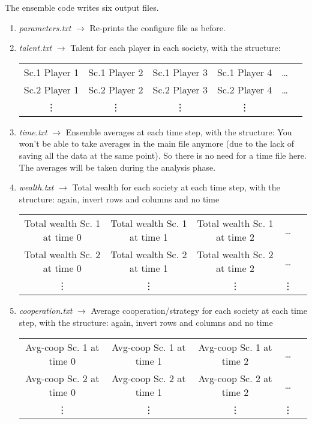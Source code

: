 \documentclass{article}
\begin{document}
The ensemble code writes six output files. 
\begin{enumerate}
\item \emph{parameters.txt} $\rightarrow$ Re-prints the configure file as before. 

\item \emph{talent.txt} $\rightarrow$ Talent for each player in each society, with the structure:

\begin{center}
\begin{tabular}{c c c c c c}
Sc.1 Player 1 & Sc.1 Player 2 & Sc.1 Player 3 & Sc.1 Player 4 & \dots \\ 
Sc.2 Player 1 & Sc.2 Player 2 & Sc.2 Player 3 & Sc.2 Player 4 & \dots \\
\vdots & \vdots &  \vdots &  \vdots &   
\end{tabular} 
\end{center}


\item \emph{time.txt} $\rightarrow$ Ensemble averages at each time step, with the structure:
{\color{red}You won't be able to take averages in the main file anymore (due to the lack of saving all the data at the same point). So there is no need for a time file here. The averages will be taken during the analysis phase.}

\item \emph{wealth.txt} $\rightarrow$ Total wealth for each society at each time step, with the structure:
{\color{red}again, invert rows and columns and no time}

\begin{center}
\begin{tabular}{c c c c c}
Total wealth Sc. 1 at time 0 & Total wealth Sc. 1 at time 1  & Total wealth Sc. 1 at time 2   & \dots \\
Total wealth Sc. 2 at time 0 & Total wealth Sc. 2 at time 1  & Total wealth Sc. 2 at time 2   & \dots \\
\vdots & \vdots &  \vdots &  \vdots &
\end{tabular} 
\end{center}

\item \emph{cooperation.txt} $\rightarrow$ Average cooperation/strategy for each society at each time step, with the structure:
{\color{red}again, invert rows and columns and no time}

\begin{center}
\begin{tabular}{c c c c c}
Avg-coop Sc. 1 at time 0 & Avg-coop Sc. 1 at time 1  & Avg-coop Sc. 1 at time 2   & \dots \\
Avg-coop Sc. 2 at time 0 & Avg-coop Sc. 2 at time 1  & Avg-coop Sc. 2 at time 2   & \dots \\
\vdots & \vdots &  \vdots &  \vdots &
\end{tabular} 
\end{center}


\end{enumerate}
\end{document}
